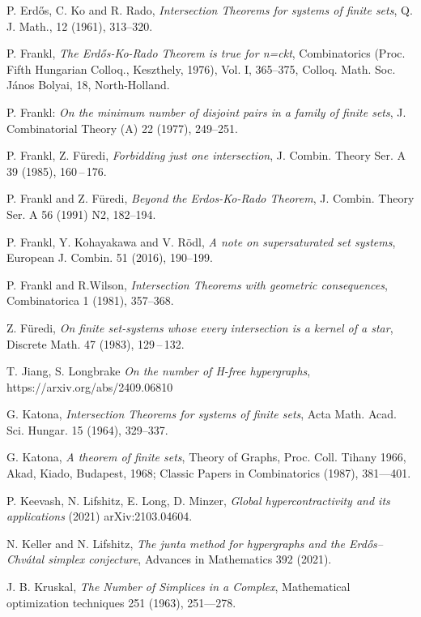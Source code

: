 \documentclass[12pt,a4paper]{article}
\begin{document}
\begin{thebibliography}{}
 P. Erd\H os, C. Ko and R. Rado, \textit{Intersection Theorems for systems of finite sets}, Q. J. Math., 12
(1961), 313--320.

 P. Frankl, \textit{The Erd\H os-Ko-Rado Theorem is true for n=ckt}, Combinatorics (Proc. Fifth Hungarian Colloq., Keszthely, 1976), Vol. I, 365--375, Colloq. Math. Soc. J\'anos Bolyai, 18, North-Holland.

 P. Frankl: {\it On the minimum number of disjoint pairs in a family of finite sets},
J. Combinatorial Theory (A) 22 (1977), 249--251.


 P. Frankl, Z. Füredi,
    \textit{Forbidding just one intersection},
    J. Combin. Theory Ser. A 39 (1985), 160\,--\,176.

 P. Frankl and Z. F\"uredi, \textit{Beyond the Erdos-Ko-Rado Theorem},  J. Combin.  Theory Ser. A  56 (1991) N2, 182--194.


 P. Frankl, Y. Kohayakawa and V. R\"odl, {\it A note on supersaturated set systems}, European J. Combin. 51 (2016), 190--199.

 P. Frankl and R.Wilson, {\it Intersection Theorems with geometric consequences}, Combinatorica
1 (1981), 357--368.


 Z. Füredi,
    \textit{On finite set-systems whose every intersection is a kernel of a star},
    Discrete Math. 47 (1983), 129\,--\,132.


 T. Jiang, S. Longbrake
    \textit{On the number of H-free hypergraphs},
    https://arxiv.org/abs/2409.06810

 G. Katona, {\it Intersection Theorems for systems of finite sets}, Acta Math. Acad. Sci. Hungar. 15  (1964),
329--337.

 G. Katona, {\it A theorem of finite sets}, Theory of Graphs, Proc. Coll. Tihany 1966, Akad, Kiado, Budapest, 1968; Classic Papers in Combinatorics (1987), 381---401. 

 P. Keevash, N. Lifshitz, E. Long, D. Minzer, {\it Global hypercontractivity and its applications} (2021) arXiv:2103.04604.

 N. Keller and N. Lifshitz, {\it The junta method for hypergraphs and the Erd\H os--Chv\'atal simplex conjecture}, Advances in Mathematics 392 (2021).

 J. B. Kruskal, {\it The Number of Simplices in a Complex}, Mathematical optimization
techniques 251 (1963), 251---278.


\end{thebibliography}
\end{document}
